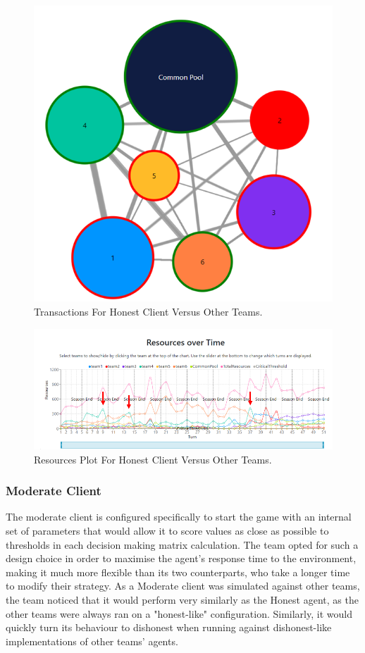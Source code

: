 \begin{figure}[H]
\centering
\includegraphics[scale=0.4]{12_team4_agentdesign/images/TransactionsHO.png}
\caption{Transactions For Honest Client Versus Other Teams.}
\label{fig:TransactionsHO}
\end{figure}
\begin{figure}[H]
\centering
\includegraphics[scale=0.7]{12_team4_agentdesign/images/ResourcesHO.PNG}
\caption{Resources Plot For Honest Client Versus Other Teams.}
\label{fig:ResourcesHO}
\end{figure}

\subsubsection{Moderate Client} \label{moderateAO}
The moderate client is configured specifically to start the game with an internal set of parameters that would allow it to score values as close as possible to thresholds in each decision making matrix calculation. The team opted for such a design choice in order to maximise the agent's response time to the environment, making it much more flexible than its two counterparts, who take a longer time to modify their strategy. As a Moderate client was simulated against other teams, the team noticed that it would perform very similarly as the Honest agent, as the other teams were always ran on a "honest-like" configuration. Similarly, it would quickly turn its behaviour to dishonest when running against dishonest-like implementations of other teams' agents.

